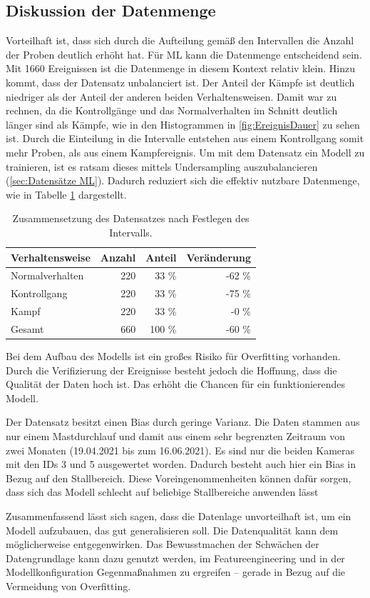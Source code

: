 \subsection{Diskussion der Datenmenge}
Vorteilhaft ist, dass sich durch die Aufteilung gemäß den Intervallen die Anzahl der Proben deutlich erhöht hat. Für \gls{ML} kann die Datenmenge entscheidend sein. Mit 1660 Ereignissen ist die Datenmenge in diesem Kontext relativ klein. Hinzu kommt, dass der Datensatz unbalanciert ist. Der Anteil der Kämpfe ist deutlich niedriger als der Anteil der anderen beiden Verhaltensweisen. Damit war zu rechnen, da die Kontrollgänge und das Normalverhalten im Schnitt deutlich länger sind als Kämpfe, wie in den Histogrammen in \autoref{fig:EreignisDauer} zu sehen ist. Durch die Einteilung in die Intervalle entstehen aus einem Kontrollgang somit mehr Proben, als aus einem Kampfereignis. Um mit dem Datensatz ein Modell zu trainieren, ist es ratsam dieses mittels Undersampling auszubalancieren (\autoref{sec:Datensätze ML}). Dadurch reduziert sich die effektiv nutzbare Datenmenge, wie in Tabelle \ref{tab:DataNachBalance} dargestellt.

\begin{table}[ht]
    \centering
    \caption{Zusammensetzung des Datensatzes nach Festlegen des Intervalls.}
    \begin{tabular}{|l|r|r|r|}
    \hline
        Verhaltensweise & Anzahl & Anteil & Veränderung\\
    \hline
        Normalverhalten & 220 & 33 \% & -62 \%\\
        Kontrollgang & 220 & 33 \% & -75 \%\\
        Kampf & 220 & 33 \% & -0 \%\\
    \hline
    \hline
        Gesamt & 660 & 100 \% & -60 \% \\
    \hline
    \end{tabular}
    \label{tab:DataNachBalance}
\end{table}

Bei dem Aufbau des Modells ist ein großes Risiko für Overfitting vorhanden. Durch die Verifizierung der Ereignisse besteht jedoch die Hoffnung, dass die Qualität der Daten hoch ist. Das erhöht die Chancen für ein funktionierendes Modell. \par

Der Datensatz besitzt einen Bias durch geringe Varianz. Die Daten stammen aus nur einem Mastdurchlauf und damit aus einem sehr begrenzten Zeitraum von zwei Monaten (19.04.2021 bis zum 16.06.2021). Es sind nur die beiden Kameras mit den IDs 3 und 5 ausgewertet worden. Dadurch besteht auch hier ein Bias in Bezug auf den Stallbereich. Diese Voreingenommenheiten können dafür sorgen, dass sich das Modell schlecht auf beliebige Stallbereiche anwenden lässt\par

Zusammenfassend lässt sich sagen, dass die Datenlage unvorteilhaft ist, um ein Modell aufzubauen, das gut generalisieren soll. Die Datenqualität kann dem möglicherweise entgegenwirken. Das Bewusstmachen der Schwächen der Datengrundlage kann dazu genutzt werden, im Featureengineering und in der Modellkonfiguration Gegenmaßnahmen zu ergreifen – gerade in Bezug auf die Vermeidung von Overfitting.